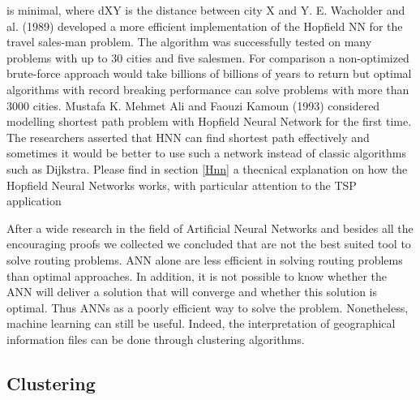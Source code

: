 is minimal, where dXY is the distance between city X and Y.
\bigbreak
E. Wacholder and al. (1989) developed a more efficient implementation of the Hopfield NN for the travel
sales-man problem. The algorithm was successfully tested on many problems with up to 30 cities and five
salesmen. For comparison a non-optimized brute-force approach would take billions of billions of years to 
return but optimal algorithms with record breaking performance can solve problems with more than 3000 cities.
\bigbreak
Mustafa K. Mehmet Ali and Faouzi Kamoun (1993) considered modelling shortest path problem with Hopfield 
Neural Network for the first time. The researchers asserted that HNN can find shortest path effectively
and sometimes it would be better to use such a network instead of classic algorithms such as Dijkstra.
Please find in section \ref{Hnn} a thecnical explanation on how the Hopfield Neural Networks works, with particular attention to the TSP application

\bigbreak
After a wide research in the field of Artificial Neural Networks and besides all the encouraging proofs we collected we concluded that are not the best suited tool to solve routing problems. ANN alone are less efficient in solving routing problems than optimal approaches.  In addition, 
it is not possible to know whether the ANN will deliver a solution that will converge and whether 
this solution is optimal. Thus ANNs as a poorly efficient way to solve the problem. Nonetheless, 
machine learning can still be useful. Indeed, the interpretation of geographical information files 
can be done through clustering algorithms.

\subsection{Clustering}


